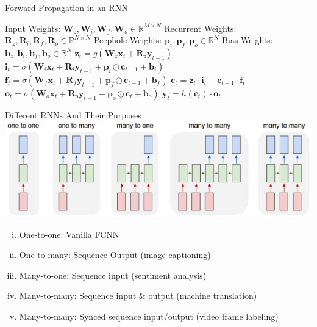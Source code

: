 \documentclass{beamer}
\begin{document}
\begin{frame}{Forward Propagation in an RNN}
    \begin{algorithm}[H]
        \caption{Forward Propagation in an LSTM}
        \begin{algorithmic}[2]
        \Require
            \Statex Input Weights: $\mathbf{W}_z, \mathbf{W}_i, \mathbf{W}_f, \mathbf{W}_o \in\mathbb{R}^{M\times N}$
            \Statex Recurrent Weights: $\mathbf{R}_z, \mathbf{R}_i, \mathbf{R}_f, \mathbf{R}_o \in\mathbb{R}^{N\times N}$
            \Statex Peephole Weights: $\mathbf{p}_i, \mathbf{p}_f, \mathbf{p}_o \in\mathbb{R}^N$
            \Statex Bias Weights: $\mathbf{b}_z, \mathbf{b}_i, \mathbf{b}_f, \mathbf{b}_o \in\mathbb{R}^N$
            \State $\mathbf{z}_t=g(\mathbf{W}_z\mathbf{x}_t+\mathbf{R}_z\mathbf{y}_{t-1})$ 
            \State $\mathbf{i}_t=\sigma(\mathbf{W}_i\mathbf{x}_t+\mathbf{R}_i\mathbf{y}_{t-1}+\mathbf{p}_i\odot\mathbf{c}_{t-1}+\mathbf{b}_i)$ 
            \State $\mathbf{f}_t=\sigma(\mathbf{W}_f\mathbf{x}_t+\mathbf{R}_f\mathbf{y}_{t-1}+\mathbf{p}_f\odot\mathbf{c}_{t-1}+\mathbf{b}_f)$ 
            \State $\mathbf{c}_t=\mathbf{z}_t\cdot\mathbf{i}_t+\mathbf{c}_{t-1}\cdot\mathbf{f}_t$ 
            \State $\mathbf{o}_t=\sigma(\mathbf{W}_o\mathbf{x}_t+\mathbf{R}_o\mathbf{y}_{t-1}+\mathbf{p}_o\odot\mathbf{c}_t+\mathbf{b}_o)$ 
            \State $\mathbf{y}_t=h(\mathbf{c}_t)\cdot\mathbf{o}_t$ 
        \EndProcedure
    \end{algorithmic}
    \end{algorithm}
\end{frame}
\begin{frame}{Different RNNs And Their Purposes}
    \includegraphics[width=\textwidth]{images/b4sus.jpg}
    \begin{enumerate}[i.]
        \item One-to-one: Vanilla FCNN
        \item One-to-many: Sequence Output (image captioning)
        \item Many-to-one: Sequence input (sentiment analysis)
        \item Many-to-many: Sequence input $\&$ output (machine translation)
        \item Many-to-many: Synced sequence input/output (video frame labeling)
    \end{enumerate}
\end{frame}
\end{document}
